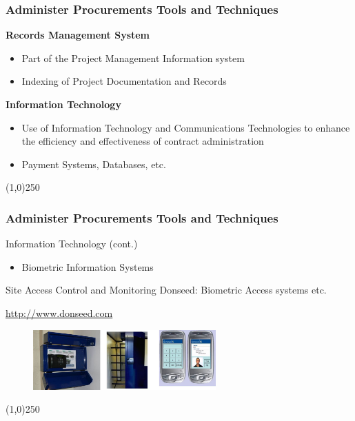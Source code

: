 \begin{frame}
\frametitle{Administer Procurements \hfill\hfill Tools and Techniques}
\textbf{Records Management System}
\begin{itemize}
	\item Part of the Project Management Information system
	\item Indexing of Project Documentation and Records
\end{itemize}
\textbf{Information Technology}
\begin{itemize}
	\item Use of Information Technology and Communications Technologies to enhance the efficiency and effectiveness of contract administration
\item Payment Systems, Databases, etc.
\end{itemize}
\end{frame}\begin{center}\line(1,0){250}\end{center}



\begin{frame}
\frametitle{Administer Procurements \hfill\hfill Tools and Techniques}

Information Technology (cont.)
\begin{itemize}
	\item Biometric Information Systems
\end{itemize}
Site Access Control and Monitoring
Donseed: Biometric Access systems etc.


\href{http://www.donseed.com}{http://www.donseed.com}
\begin{figure}
	\centering
		\includegraphics[width = 7cm]{images/donseed.jpg}
	\label{fig:donseed}
\end{figure}
\end{frame}\begin{center}\line(1,0){250}\end{center}




